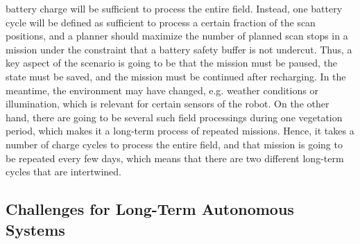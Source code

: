 \documentclass[english, master, expose, utf8]{base/thesis_KBS}
\begin{document}
battery charge will be sufficient to process the entire field. Instead, one battery cycle will be defined as sufficient to process a certain fraction of the scan
positions, and a planner should maximize the number of planned scan stops in a mission under the constraint that a battery safety buffer is not undercut.
Thus, a key aspect of the scenario is going to be that the mission must be paused, the state must be saved, and the mission must be continued after recharging.
In the meantime, the environment may have changed, e.g. weather conditions or illumination, which is relevant for certain sensors of the robot.
On the other hand, there are going to be several such field processings during one vegetation period, which makes it a long-term process of repeated missions.
Hence, it takes a number of charge cycles to process the entire field, and that mission is going to be repeated every few days,
which means that there are two different long-term cycles that are intertwined.\newline

\subsection{Challenges for Long-Term Autonomous Systems}
\label{sec:challenges_for_lta}
\end{document}
